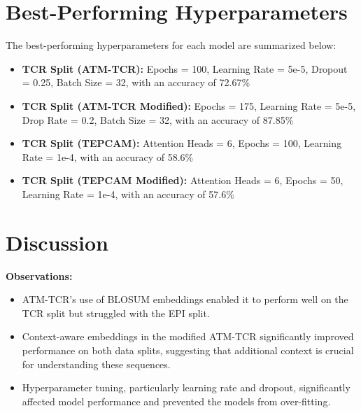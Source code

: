 \documentclass[11pt,a4paper]{article}
\begin{document}
\section{Best-Performing Hyperparameters}
The best-performing hyperparameters for each model are summarized below:
\begin{itemize}
    \item \textbf{TCR Split (ATM-TCR):} Epochs = 100, Learning Rate = 5e-5, Dropout = 0.25, Batch Size = 32, with an accuracy of 72.67\%
    \item \textbf{TCR Split (ATM-TCR Modified):} Epochs = 175, Learning Rate = 5e-5, Drop Rate = 0.2, Batch Size = 32, with an accuracy of 87.85\%
    \item \textbf{TCR Split (TEPCAM):} Attention Heads = 6, Epochs = 100, Learning Rate = 1e-4, with an accuracy of 58.6\%
    \item \textbf{TCR Split (TEPCAM Modified):} Attention Heads = 6, Epochs = 50, Learning Rate = 1e-4, with an accuracy of 57.6\%
\end{itemize}

\section{Discussion}
\textbf{Observations:}
\begin{itemize}
    \item ATM-TCR's use of BLOSUM embeddings enabled it to perform well on the TCR split but struggled with the EPI split.
    \item Context-aware embeddings in the modified ATM-TCR significantly improved performance on both data splits, suggesting that additional context is crucial for understanding these sequences.
    \item Hyperparameter tuning, particularly learning rate and dropout, significantly affected model performance and prevented the models from over-fitting.
\end{itemize}
\end{document}

